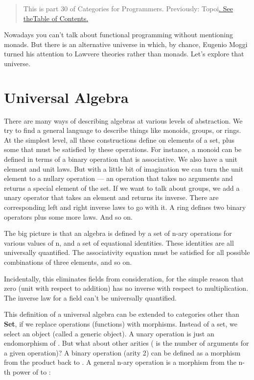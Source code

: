 \begin{quote}
This is part 30 of Categories for Programmers. Previously:
{Topoi}\href{https://bartoszmilewski.com/2017/07/22/topoi/}{. See
the}\href{https://bartoszmilewski.com/2014/10/28/category-theory-for-programmers-the-preface/}{Table
of Contents}\href{https://bartoszmilewski.com/2017/07/22/topoi/}{.}
\end{quote}

Nowadays you can't talk about functional programming without mentioning
monads. But there is an alternative universe in which, by chance,
Eugenio Moggi turned his attention to Lawvere theories rather than
monads. Let's explore that universe.

\section{Universal Algebra}\label{universal-algebra}

There are many ways of describing algebras at various levels of
abstraction. We try to find a general language to describe things like
monoids, groups, or rings. At the simplest level, all these
constructions define  on elements of a set, plus some
 that must be satisfied by these operations. For instance, a
monoid can be defined in terms of a binary operation that is
associative. We also have a unit element and unit laws. But with a
little bit of imagination we can turn the unit element to a nullary
operation --- an operation that takes no arguments and returns a special
element of the set. If we want to talk about groups, we add a unary
operator that takes an element and returns its inverse. There are
corresponding left and right inverse laws to go with it. A ring defines
two binary operators plus some more laws. And so on.

The big picture is that an algebra is defined by a set of n-ary
operations for various values of n, and a set of equational identities.
These identities are all universally quantified. The associativity
equation must be satisfied for all possible combinations of three
elements, and so on.

Incidentally, this eliminates fields from consideration, for the simple
reason that zero (unit with respect to addition) has no inverse with
respect to multiplication. The inverse law for a field can't be
universally quantified.

This definition of a universal algebra can be extended to categories
other than \textbf{Set}, if we replace operations (functions) with
morphisms. Instead of a set, we select an object  (called a
generic object). A unary operation is just an endomorphism of
. But what about other arities ( is the number of
arguments for a given operation)? A binary operation (arity 2) can be
defined as a morphism from the product  back to .
A general n-ary operation is a morphism from the n-th power of
 to :

